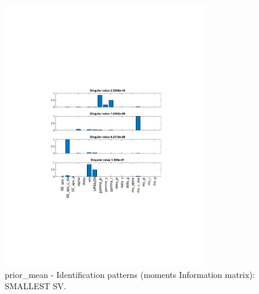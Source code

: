 
\begin{figure}[H]
\centering 
\includegraphics[width=0.8\textwidth]{nash/identification/nash_ident_pattern_prior_mean_1}
\caption{prior_mean - Identification patterns (moments Information matrix): SMALLEST SV.}\label{Fig:ident_pattern:prior_mean:1}
\end{figure}

